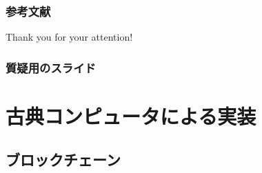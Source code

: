 \begin{frame}[allowframebreaks]
  \frametitle{参考文献}

  
  
\end{frame}

\begin{frame}
  \centering
  {\Huge Thank you for your attention!}
\end{frame}

\appendix

\begin{frame}
  \frametitle{質疑用のスライド}

  \tableofcontents
\end{frame}

\section{古典コンピュータによる実装}

\subsection{ブロックチェーン}
 
